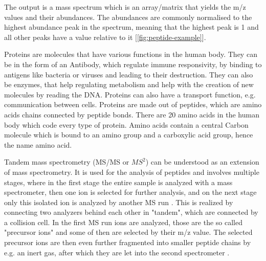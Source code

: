 \documentclass[11pt]{article}
\begin{document}
The output is a mass spectrum which is an array/matrix that yields the m/z values and their abundances. The abundances are commonly normalised to the highest abundance peak in the spectrum, meaning that the highest peak is 1 and all other peaks have a value relative to it [\cref{fig:peptide-example}]. 

Proteins are molecules that have various functions in the human body. They can be in the form of an Antibody, which regulate immune responsivity, by binding to antigens like bacteria or viruses and leading to their destruction. They can also be enzymes, that help regulating metabolism and help with the creation of new molecules by reading the DNA. Proteins can also have a transport function, e.g. communication between cells. Proteins are made out of peptides, which are amino acids chains connected by peptide bonds. There are 20 amino acids in the human body which code every type of protein. Amino acids contain a central Carbon molecule which is bound to an amino group and a carboxylic acid group, hence the name amino acid. 

Tandem mass spectrometry (MS/MS or \(MS^2\)) can be understood as an extension of mass spectrometry. It is used for the analysis of peptides and involves multiple stages, where in the first stage the entire sample is analyzed with a mass spectrometer, then one ion is selected for further analysis, and on the next stage only this isolated ion is analyzed by another MS run \cite{tandem-mass-spectrometry}. This is realized by connecting two analyzers behind each other in "tandem", which are connected by a collision cell. In the first MS run ions are analyzed, those are the so called "precursor ions" and some of then are selected by their m/z value. The selected precursor ions are then even further fragmented into smaller peptide chains by e.g. an inert gas, after which they are let into the second spectrometer \cite{tandem-mass-spec-deutsch, tandem-mass-spec-yt}.
\end{document}
